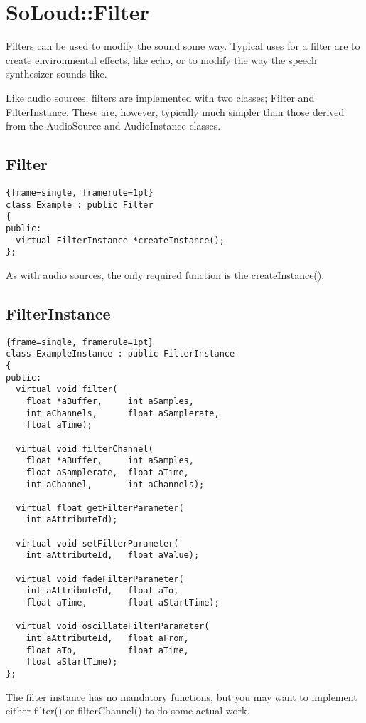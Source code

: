 
\chapter{SoLoud::Filter}

Filters can be used to modify the sound some way. Typical uses for a filter are to create environmental effects, like echo, or to modify the way the speech synthesizer sounds like.

Like audio sources, filters are implemented with two classes; Filter and FilterInstance. These are, however, typically much simpler than those derived from the AudioSource and AudioInstance classes.

\section{Filter}
\begin{lstlisting}{frame=single, framerule=1pt}
class Example : public Filter
{
public:
  virtual FilterInstance *createInstance();
};
\end{lstlisting}

As with audio sources, the only required function is the createInstance().

\section{FilterInstance}

\begin{lstlisting}{frame=single, framerule=1pt}
class ExampleInstance : public FilterInstance
{
public:
  virtual void filter(
    float *aBuffer,     int aSamples, 
    int aChannels,      float aSamplerate, 
    float aTime);
    
  virtual void filterChannel(
    float *aBuffer,     int aSamples, 
    float aSamplerate,  float aTime, 
    int aChannel,       int aChannels);
    
  virtual float getFilterParameter(
    int aAttributeId);
    
  virtual void setFilterParameter(
    int aAttributeId,   float aValue);
    
  virtual void fadeFilterParameter(
    int aAttributeId,   float aTo, 
    float aTime,        float aStartTime);
    
  virtual void oscillateFilterParameter(
    int aAttributeId,   float aFrom, 
    float aTo,          float aTime, 
    float aStartTime);
};
\end{lstlisting}
The filter instance has no mandatory functions, but you may want to implement either filter() or filterChannel() to do some actual work.

